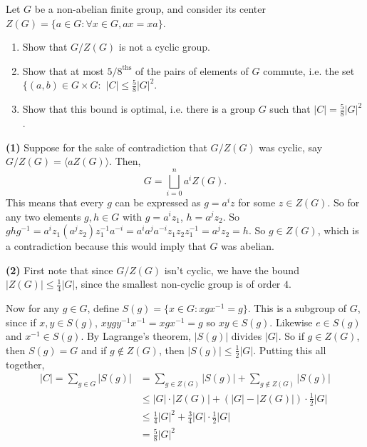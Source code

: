 \documentclass[11pt,letterpaper]{article}
\begin{document}
\pagebreak
\begin{problem}
  Let $G$ be a non-abelian finite group, and consider its center $Z(G)=\{ a\in G : \forall x\in G, ax=xa \}$.
  \begin{enumerate}
    \item Show that $G /Z(G)$ is not a cyclic group.
    \item Show that at most $5 /8 ^\textrm{ths}$ of the pairs of elements of $G$ commute, i.e. the set $\{(a,b)\in G\times G : $  $|C|\leq\frac{5}{8}|G|^2$.
    \item Show that this bound is optimal, i.e. there is a group $G$ such that $|C|=\frac{5}{8}|G|^2$. 
  \end{enumerate} 
\end{problem}

\textbf{(1)} Suppose for the sake of contradiction that $G/ Z(G)$ was cyclic, say $G /Z(G)=\big\langle aZ(G)\big\rangle$. Then,
\[G=\bigsqcup_{i=0}^n a^iZ(G).\]
This means that every $g$ can be expressed as $g=a^iz$ for some $z\in Z(G)$. So for any two elements $g,h\in G$ with $g=a^iz_1$, $h=a^jz_2$. So $ghg^{-1}=a^iz_1(a^jz_2)z_1^{-1}a^{-i}=a^ia^ja^{-i}z_1z_2z_1^{-1}=a^jz_2=h$. So $g\in Z(G)$, which is a contradiction because this would imply that $G$ was abelian.          

\textbf{(2)} First note that since $G /Z(G)$ isn't cyclic, we have the bound $|Z(G)|\leq \frac{1}{4}|G|$, since the smallest non-cyclic group is of order $4$. 

Now for any $g\in G$, define $S(g)=\{x\in G : xgx^{-1}=g\}$. This is a subgroup of $G$, since if $x,y\in S(g)$, $xygy^{-1}x^{-1}=xgx^{-1}=g$ so $xy\in S(g)$. Likewise $e\in S(g)$ and $x^{-1}\in S(g)$. By Lagrange's theorem, $|S(g)|$ divides $|G|$. So if $g\in Z(G)$, then $S(g)=G$ and if $g\notin Z(G)$, then $|S(g)|\leq \frac{1}{2}|G|$. Putting this all together,
\begin{align*}
  |C|=\sum_{g\in G}|S(g)|&=\sum_{g\in Z(G)}|S(g)|+\sum_{g\notin Z(G)}|S(g)|\\&\leq |G|\cdot |Z(G)|+(|G|-|Z(G)|)\cdot \frac{1}{2}|G|\\
&\leq \frac{1}{4}|G|^2+\frac{3}{4}|G|\cdot \frac{1}{2}|G|\\
&=\frac{5}{8}|G|^2\end{align*}   
\end{document}
